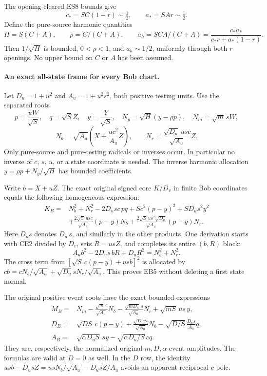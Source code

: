 The opening-cleared ES8 bounds give
\[
 c_*=SC(1-r)\sim\tfrac12,\qquad
 a_*=SAr\sim\tfrac12.
\]
Define the pure-source harmonic quantities
\[
 H=S(C+A),\qquad \rho=C/(C+A),\qquad
 a_h=SCA/(C+A)=\frac{c_*a_*}{c_*r+a_*(1-r)}.
                                                               \tag{EB3}
\]
Then $1/\sqrt H$ is bounded, $0<\rho<1$, and $a_h\sim1/2$,
uniformly through both $r$ openings. No upper bound on $C$ or $A$
has been assumed.

\paragraph{An exact all-state frame for every Bob chart.}
Let $D_u=1+u^2$ and $A_u=1+u^2s^2$, both positive testing units.
Use the separated roots
\[
 p=\frac{uW}{\sqrt S},\quad q=\sqrt S Z,\quad
 y=\frac Y{\sqrt S},\quad N_y=\sqrt H(y-\rho p),
 \quad N_m=\sqrt m\,sW,
\]
\[
 N_b=\sqrt{A_u}\left(X+\frac{uc^2}{A_u}Z\right),
 \qquad N_r=\frac{\sqrt{D_u}\,usc}{\sqrt{A_u}}Z.
                                                               \tag{EB4}
\]
Only pure-source and pure-testing radicals or inverses occur.
In particular no inverse of $c$, $s$, $u$, or a state coordinate is
needed. The inverse harmonic allocation
$y=\rho p+N_y/\sqrt H$ has bounded coefficients.

Write $b=X+uZ$. The exact original signed core $K/D_v$ in finite
Bob coordinates equals the following homogeneous expression:
\[
\begin{split}
 K_B={}&N_b^2+N_r^2-2D_usc\,pq
       +Sc^2(p-y)^2+SD_us^2y^2\\
 &+\frac{2\sqrt S\,usc}{\sqrt{A_u}}(p-y)N_b
  +\frac{2\sqrt S\,us^2\sqrt{D_u}}{\sqrt{A_u}}(p-y)N_r.
\end{split}                                                    \tag{EB5}
\]
Here $D_us$ denotes $D_u\,s$, and similarly in the other products.
One derivation starts with CE2 divided by $D_v$, sets
$R=usZ$, and completes its entire $(b,R)$ block:
\[
 A_ub^2-2D_us\,bR+D_uR^2=N_b^2+N_r^2.
\]
The cross term from
$[\sqrt S\,c(p-y)+usb]^2$ is allocated by
$cb=cN_b/\sqrt{A_u}+\sqrt{D_u}sN_r/\sqrt{A_u}$.
This proves EB5 without deleting a first state normal.

The original positive event roots have the exact bounded expressions
\[
 \begin{split}
 M_B={}&N_m-\frac{\sqrt m\,c}{\sqrt{A_u}}N_b
       -\frac{\sqrt{mD_u}\,s}{\sqrt{A_u}}N_r
       +\sqrt{mS}\,us\,y,\\
 D_B={}&\sqrt{DS}\,c(p-y)
       +\frac{\sqrt D\,us}{\sqrt{A_u}}N_b
       -\sqrt{D/S}\,\frac{D_us}{A_u}q,\\
 A_B={}&\sqrt{\alpha D_uS}\,s y
       -\sqrt{\alpha D_u/S}\,c q.
 \end{split}                                                   \tag{EB6}
\]
They are, respectively, the normalized original $m,D,\alpha$ event
amplitudes. The formulas are valid at $D=0$ as well. In the $D$ row,
the identity
$usb-D_usZ=usN_b/\sqrt{A_u}-D_usZ/A_u$
avoids an apparent reciprocal-$c$ pole.

